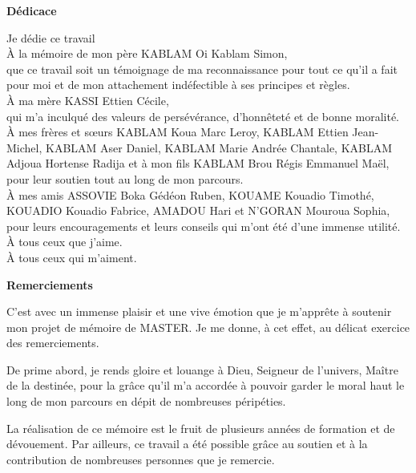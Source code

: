 \begin{center}
	\LARGE{\textbf{Dédicace}}
\end{center}

\begin{center}
	Je dédie ce travail\\
	\uppercase{à} la mémoire de mon père KABLAM Oi Kablam Simon, \\ que ce travail soit un témoignage de ma reconnaissance pour tout ce qu'il a fait pour moi et de mon attachement indéfectible à ses principes et règles. \\
	\uppercase{à} ma mère KASSI Ettien Cécile, \\ qui m'a inculqué des valeurs de persévérance, d'honnêteté et de bonne moralité. \\
	\uppercase{à} mes frères et sœurs KABLAM Koua Marc Leroy, KABLAM Ettien Jean-Michel, KABLAM Aser Daniel, KABLAM Marie Andrée Chantale, KABLAM Adjoua Hortense Radija et à mon fils KABLAM Brou Régis Emmanuel Maël, \\ pour leur soutien tout au long de mon parcours.\\
	\uppercase{à} mes amis ASSOVIE Boka Gédéon Ruben, KOUAME Kouadio Timothé, KOUADIO Kouadio Fabrice, AMADOU Hari et N'GORAN Mouroua Sophia, \\ pour leurs encouragements et leurs conseils qui m'ont été d'une immense utilité.\\
	\uppercase{à} tous ceux que j'aime.\\
	\uppercase{à} tous ceux qui m'aiment.
	
	
\end{center} 

\newpage
{}
\begin{center}
	\LARGE{\textbf{Remerciements}}
\end{center}
C'est avec un immense plaisir et une vive émotion que je m'apprête à soutenir mon projet de mémoire de MASTER. Je me donne, à cet effet, au délicat exercice des remerciements.

De prime abord, je rends gloire et louange à Dieu, Seigneur de l'univers, Maître de la destinée, pour la grâce qu'il m'a accordée à pouvoir garder le moral haut le long de mon parcours en dépit de nombreuses péripéties.

La réalisation de ce mémoire est le fruit de plusieurs années de formation et de dévouement. 
Par ailleurs, ce travail a été possible grâce au soutien et à la contribution de nombreuses personnes que je remercie.


